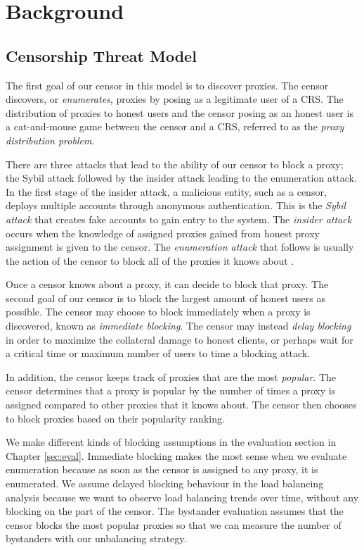\chapter{Background}
\label{sec:background}
\newtheorem{theorem}{Theorem}

\section{Censorship Threat Model} 

The first goal of our censor in this model is to discover proxies. The censor discovers, or \textit{enumerates}, proxies by posing as a legitimate user of a \ac{CRS}. The distribution of proxies to honest users and the censor posing as an honest user is a cat-and-mouse game between the censor and a \ac{CRS}, referred to as the \textit{proxy distribution problem}. 

There are three attacks that lead to the ability of our censor to block a proxy; the Sybil attack followed by the insider attack leading to the enumeration attack. In the first stage of the insider attack, a malicious entity, such as a censor, deploys multiple accounts through anonymous authentication. This is the \textit{Sybil attack} that creates fake accounts to gain entry to the system. The \textit{insider attack} occurs when the knowledge of assigned proxies gained from honest proxy assignment is given to the censor. The \textit{enumeration attack} that follows is usually the action of the censor to block all of the proxies it knows about \cite{wang2013rbridge}.

Once a censor knows about a proxy, it can decide to block that proxy. The second goal of our censor is to block the largest amount of honest users as possible. The censor may choose to block immediately when a proxy is discovered, known as \textit{immediate blocking}. The censor may instead \textit{delay blocking} in order to maximize the collateral damage to honest clients, or perhaps wait for  a critical time or maximum number of users to time a blocking attack. 

In addition, the censor keeps track of proxies that are the most \textit{popular}. The censor determines that a proxy is popular by the number of times a proxy is assigned compared to other proxies that it knows about. The censor then chooses to block proxies based on their popularity ranking.

We make different kinds of blocking assumptions in the evaluation section in Chapter \ref{sec:eval}. Immediate blocking makes the most sense when we evaluate enumeration because as soon as the censor is assigned to any proxy, it is enumerated. We assume delayed blocking behaviour in the load balancing analysis because we want to observe load balancing trends over time, without any blocking on the part of the censor. The bystander evaluation assumes that the censor blocks the most popular proxies so that we can measure the number of bystanders with our unbalancing strategy.

